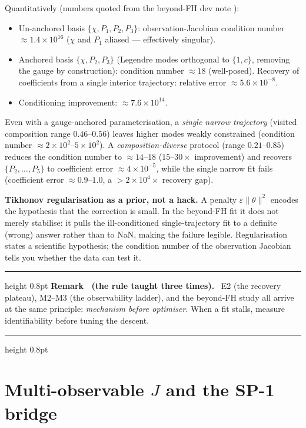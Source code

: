 \documentclass[11pt]{article}
\newcounter{remark}
\newenvironment{remark}[1]{%
  \refstepcounter{remark}\par\medskip
  \noindent\begin{minipage}{\linewidth}
  \hrule height 0.8pt \smallskip
  \textbf{Remark \theremark\ (#1).}\ }{%
  \smallskip\hrule height 0.8pt \end{minipage}\par\medskip}
\begin{document}
Quantitatively (numbers quoted from the beyond-FH dev note
\cite{beyondfh2026}):
\begin{itemize}
\item Un-anchored basis $\{\chi, P_1, P_2, P_3\}$:
  observation-Jacobian condition number $\approx 1.4 \times 10^{16}$
  ($\chi$ and $P_1$ aliased --- effectively singular).
\item Anchored basis $\{\chi, P_2, P_3\}$ (Legendre modes orthogonal
  to $\{1, c\}$, removing the gauge by construction):
  condition number $\approx 18$ (well-posed).  Recovery of coefficients
  from a single interior trajectory: relative error $\approx 5.6 \times
  10^{-8}$.
\item Conditioning improvement: $\approx 7.6 \times 10^{14}$.
\end{itemize}
Even with a gauge-anchored parameterisation, a \emph{single narrow
trajectory} (visited composition range $0.46$--$0.56$) leaves higher
modes weakly constrained (condition number $\approx 2 \times 10^2$--$5
\times 10^2$).  A \emph{composition-diverse} protocol (range
$0.21$--$0.85$) reduces the condition number to $\approx 14$--$18$
($15$--$30\times$ improvement) and recovers $\{P_2, \ldots, P_5\}$ to
coefficient error $\approx 4 \times 10^{-5}$, while the single narrow fit
fails (coefficient error $\approx 0.9$--$1.0$, a $> 2 \times 10^4\times$
recovery gap).

\textbf{Tikhonov regularisation as a prior, not a hack.}  A penalty
$\varepsilon \|\theta\|^2$ encodes the hypothesis that the correction is
small.  In the beyond-FH fit it does not merely stabilise: it pulls the
ill-conditioned single-trajectory fit to a definite (wrong) answer rather
than to NaN, making the failure legible.  Regularisation states a
scientific hypothesis; the condition number of the observation Jacobian
tells you whether the data can test it.

\begin{remark}{the rule taught three times}
E2 (the recovery plateau), M2--M3 (the observability ladder), and the
beyond-FH study all arrive at the same principle: \emph{mechanism before
optimiser}.  When a fit stalls, measure identifiability before tuning
the descent.
\end{remark}

\section{Multi-observable $J$ and the SP-1 bridge}
\label{sec:multiobs}
\end{document}
